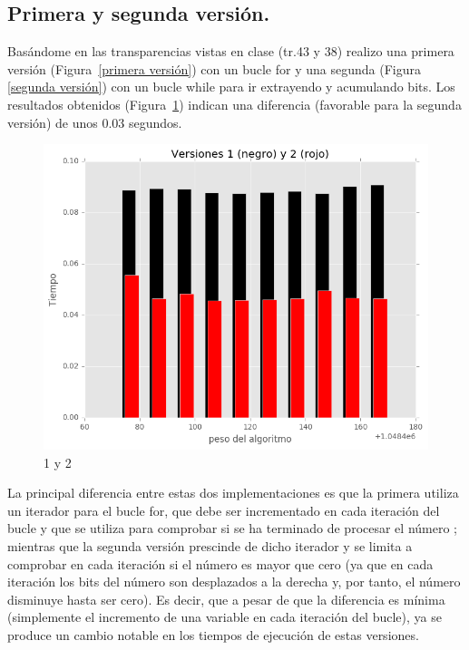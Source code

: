 \documentclass[a4paper, 11pt]{article}
\begin{document}
\subsection{Primera y segunda versión.}
Basándome en las transparencias vistas en clase (tr.43 y 38) realizo una primera versión (Figura~\ref{primera versión}) con un bucle for y una segunda (Figura \ref{segunda versión}) con un bucle while para ir extrayendo y acumulando bits. Los resultados obtenidos (Figura~\ref{1y2}) indican una diferencia (favorable para la segunda versión) de unos 0.03 segundos. 
\begin{figure}[!hbp]
	\includegraphics[scale=0.6]{1y2.png}
	\caption{1 y 2	\label{1y2}}
\end{figure}
La principal diferencia entre estas dos implementaciones es que la primera utiliza un iterador para el bucle for, que debe ser incrementado en cada iteración del bucle y que se utiliza para comprobar si se ha terminado de procesar el número ; mientras que la segunda versión prescinde de dicho iterador y se limita a comprobar en cada iteración si el número es mayor que cero (ya que en cada iteración los bits del número son desplazados a la derecha y, por tanto, el número disminuye hasta ser cero). Es decir, que a pesar de que la diferencia es mínima (simplemente el incremento de una variable en cada iteración del bucle), ya se produce un cambio notable en los tiempos de ejecución de estas versiones.
\end{document}

